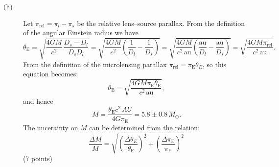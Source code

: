 \begin{description}
\item[(h)] Let $\pi_{\mathrm{rel}} = \pi_l - \pi_s$ be the relative
  lens--source parallax. From the definition of the angular Einstein radius
  we have
  \[
    \theta_{\mathrm{E}}
    = \sqrt{\frac{4GM}{c^2}\,\frac{D_s - D_l}{D_s D_l}}
    = \sqrt{\frac{4GM}{c^2}\left(\frac{1}{D_l} - \frac{1}{D_s}\right)}
    = \sqrt{\frac{4GM}{c^2\,\mathrm{au}}
      \left(\frac{\mathrm{au}}{D_l} - \frac{\mathrm{au}}{D_s}\right)}
    = \sqrt{\frac{4GM\pi_{\mathrm{rel}}}{c^2\,\mathrm{au}}}.
  \]
  From the definition of the microlensing parallax
  $\pi_{\mathrm{rel}} = \pi_{\mathrm{E}}\theta_E$, so this equation
  becomes:
  \[
    \theta_{\mathrm{E}}
    = \sqrt{\frac{4GM\pi_{\mathrm{E}}\theta_{\mathrm{E}}}{c^2\,\mathrm{au}}},
  \]
  and hence
  \[
    M = \frac{\theta_{\mathrm{E}} c^2\,AU}{4G\pi_{\mathrm{E}}}
    = 5.8 \pm 0.8\,M_\odot.
  \]
  The uncerainty%
  {} on $M$ can be determined from the relation:
  \[
    \frac{\Delta M}{M}
    = \sqrt{\left(\frac{\Delta\theta_E}{\theta_{\mathrm{E}}}\right)^2
      + \left(\frac{\Delta\pi_{\mathrm{E}}}{\pi_{\mathrm{E}}}\right)^2}
  \]
  \hfill(7 points)
\end{description}
